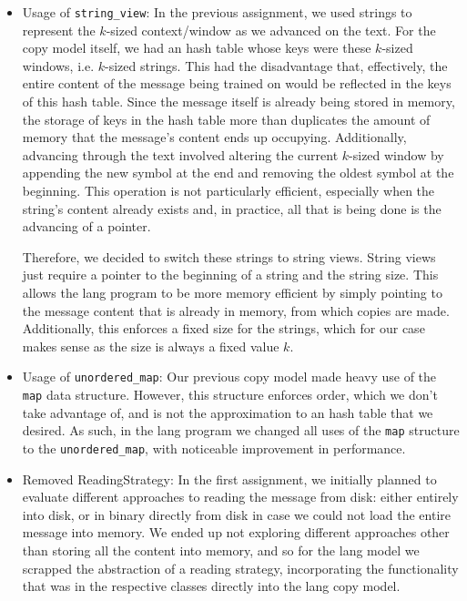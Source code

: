 \documentclass{article}
\begin{document}
\begin{itemize}
    \item Usage of \verb|string_view|:
    In the previous assignment, we used strings to represent the $k$-sized context/window as we advanced on the text.
    For the copy model itself, we had an hash table whose keys were these $k$-sized windows, i.e. $k$-sized strings.
    This had the disadvantage that, effectively, the entire content of the message being trained on would be reflected in the keys of this hash table.
    Since the message itself is already being stored in memory, the storage of keys in the hash table more than duplicates the amount of memory that the message's content ends up occupying.
    Additionally, advancing through the text involved altering the current $k$-sized window by appending the new symbol at the end and removing the oldest symbol at the beginning.
    This operation is not particularly efficient, especially when the string's content already exists and, in practice, all that is being done is the advancing of a pointer.

    Therefore, we decided to switch these strings to string views.
    String views just require a pointer to the beginning of a string and the string size.
    This allows the lang program to be more memory efficient by simply pointing to the message content that is already in memory, from which copies are made.
    Additionally, this enforces a fixed size for the strings, which for our case makes sense as the size is always a fixed value $k$.
    
    \item Usage of \verb|unordered_map|:
    Our previous copy model made heavy use of the \verb|map| data structure.
    However, this structure enforces order, which we don't take advantage of, and is not the approximation to an hash table that we desired.
    As such, in the lang program we changed all uses of the \verb|map| structure to the \verb|unordered_map|, with noticeable improvement in performance.
    
    \item Removed ReadingStrategy:
    In the first assignment, we initially planned to evaluate different approaches to reading the message from disk: either entirely into disk, or in binary directly from disk in case we could not load the entire message into memory.
    We ended up not exploring different approaches other than storing all the content into memory, and so for the lang model we scrapped the abstraction of a reading strategy, incorporating the functionality that was in the respective classes directly into the lang copy model.
\end{itemize}
\end{document}
